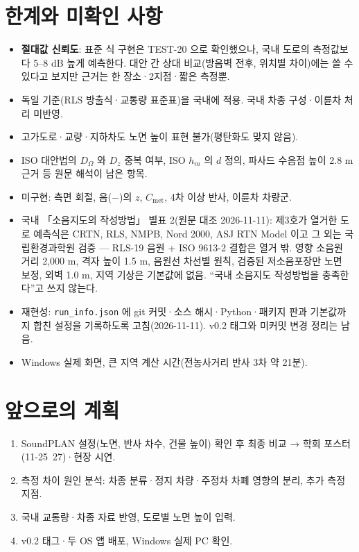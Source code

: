 \documentclass[10pt,a4paper]{article}
\newcommand{\f}[1]{\texttt{#1}}
\begin{document}
\section{한계와 미확인 사항}
\begin{itemize}
\item \textbf{절대값 신뢰도}: 표준 식 구현은 TEST-20 으로 확인했으나, 국내 도로의 측정값보다 5–8 dB 높게 예측한다. 대안 간 상대 비교(방음벽 전후, 위치별 차이)에는 쓸 수 있다고 보지만 근거는 한 장소·2지점·짧은 측정뿐.
\item 독일 기준(RLS 방출식·교통량 표준표)을 국내에 적용. 국내 차종 구성·이륜차 처리 미반영.
\item 고가도로·교량·지하차도 노면 높이 표현 불가(평탄화도 맞지 않음).
\item ISO 대안법의 $D_\Omega$ 와 $D_z$ 중복 여부, ISO $h_m$ 의 $d$ 정의, 파사드 수음점 높이 2.8 m 근거 등 원문 해석이 남은 항목.
\item 미구현: 측면 회절, 음(−)의 $z$, $C_\mathrm{met}$, 4차 이상 반사, 이륜차 차량군.
\item 국내 「소음지도의 작성방법」 별표 2(원문 대조 2026-11-11): 제3호가 열거한 도로 예측식은 CRTN, RLS, NMPB, Nord 2000, ASJ RTN Model 이고 그 외는 국립환경과학원 검증 — RLS-19 음원 + ISO 9613-2 결합은 열거 밖. 영향 소음원 거리 2,000 m, 격자 높이 1.5 m, 음원선 차선별 원칙, 검증된 저소음포장만 노면 보정, 외벽 1.0 m, 지역 기상은 기본값에 없음. ``국내 소음지도 작성방법을 충족한다''고 쓰지 않는다.
\item 재현성: \f{run\_info.json} 에 git 커밋·소스 해시·Python·패키지 판과 기본값까지 합친 설정을 기록하도록 고침(2026-11-11). v0.2 태그와 미커밋 변경 정리는 남음.
\item Windows 실제 화면, 큰 지역 계산 시간(전농사거리 반사 3차 약 21분).
\end{itemize}

\section{앞으로의 계획}
\begin{enumerate}
\item SoundPLAN 설정(노면, 반사 차수, 건물 높이) 확인 후 최종 비교 → 학회 포스터(11-25~27)·현장 시연.
\item 측정 차이 원인 분석: 차종 분류·정지 차량·주정차 차폐 영향의 분리, 추가 측정 지점.
\item 국내 교통량·차종 자료 반영, 도로별 노면 높이 입력.
\item v0.2 태그·두 OS 앱 배포, Windows 실제 PC 확인.
\end{enumerate}
\end{document}
